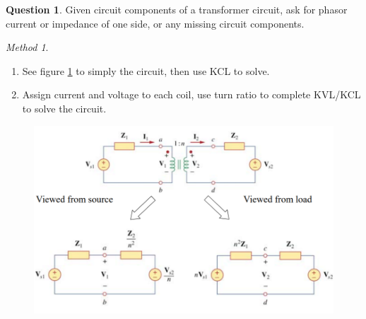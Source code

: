 \documentclass[10pt,landscape]{article}
\theoremstyle{definition}
\newtheorem*{question}{Question}
\theoremstyle{remark}
\newtheorem*{method}{Method}
\begin{document}
\begin{multicols}{3}
\begin{question}
Given circuit components of a transformer circuit, ask for phasor current or impedance of one side, or any missing circuit components. 
\end{question}

\begin{method} \mbox{} \\
\begin{enumerate}
    \item See figure \ref{fig:trans_ideal_simp} to simply the circuit, then use KCL to solve.
    \item Assign current and voltage to each coil, use turn ratio to complete KVL/KCL to solve the circuit. 
\end{enumerate}
\end{method}

\begin{figure}[H]
    \centering
    \includegraphics[width=0.9\linewidth]{202/figure/trrans_3.png}
    \caption{}
    \label{fig:trans_ideal_simp}
\end{figure}



\end{multicols}
\end{document}
